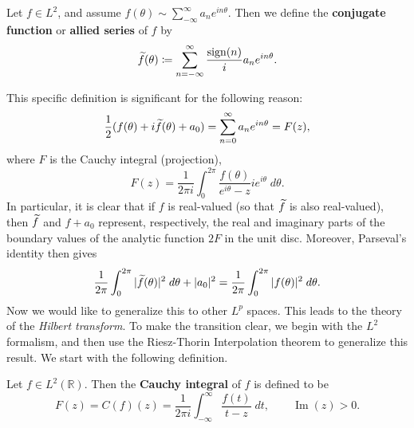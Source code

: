 \documentclass{article}
\begin{document}
\begin{definition}
	Let $f \in L^{2}$, and assume $f(\theta) \sim \sum_{-\infty}^{\infty}a_{n}e^{in\theta}$. Then we define the \textbf{conjugate function} or \textbf{allied series} of $f$ by 
	\begin{equation*}
		\widetilde{f}(\theta) \coloneqq  \sum_{n = -\infty}^{\infty}\frac{\operatorname{sign}(n)}{i}a_{n}e^{in\theta}. 
	\end{equation*} 
\end{definition}  
This specific definition is significant for the following reason:
\begin{equation*}
	\frac{1}{2}(f(\theta) + i\widetilde{f}(\theta) + a_{0}) = \sum_{n = 0}^{\infty}a_{n}e^{in\theta} = F(z), 
\end{equation*} 
where $F$ is the Cauchy integral (projection), 
\begin{equation*}
	F(z) = \frac{1}{2\pi i}\int_{0}^{2\pi}\frac{f(\theta)}{e^{i\theta} - z}ie^{i\theta}\;d\theta. 
\end{equation*} 
In particular, it is clear that if $f$ is real-valued (so that $\widetilde{f}$ is also real-valued), then $\widetilde{f}$ and $f + a_{0}$ represent, respectively, the real and imaginary parts of the boundary values of the analytic function $2F$ in the unit disc. Moreover, Parseval's identity then gives 
\begin{equation*}
	\frac{1}{2\pi}\int_{0}^{2\pi}|\widetilde{f}(\theta)|^{2}\;d\theta + |a_{0}|^{2}  = \frac{1}{2\pi}\int_{0}^{2\pi}|f(\theta)|^{2}\;d\theta. 
\end{equation*} 
Now we would like to generalize this to other $L^{p}$ spaces. This leads to the theory of the \textit{Hilbert transform}. To make the transition clear, we begin with the $L^{2}$ formalism, and then use the Riesz-Thorin Interpolation theorem to generalize this result. We start with the following definition. 
\begin{definition}
	Let $f \in L^{2}(\mathbb{R})$. Then the \textbf{Cauchy integral} of $f$ is defined to be 
	\begin{equation}
		F(z) = C(f)(z) = \frac{1}{2\pi i}\int_{-\infty}^{\infty}\frac{f(t)}{t - z}\;dt, \qquad \operatorname{Im}(z) > 0. 
		\label{eq:CauchyIntegralL2}
	\end{equation}
\end{definition} 
\end{document}
